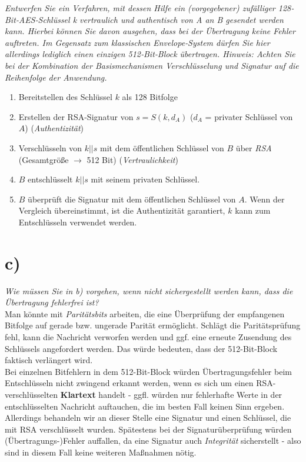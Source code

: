 \textit{Entwerfen Sie ein Verfahren, mit dessen Hilfe ein (vorgegebener) zufälliger 128‐
Bit‐AES‐Schlüssel k vertraulich und authentisch von A an B gesendet werden
kann. Hierbei können Sie davon ausgehen, dass bei der Übertragung keine Fehler
auftreten. Im Gegensatz zum klassischen Envelope‐System dürfen Sie hier allerdings lediglich einen einzigen 512‐Bit‐Block übertragen.
Hinweis: Achten Sie bei der Kombination der Basismechanismen Verschlüsselung und Signatur auf die Reihenfolge der Anwendung.}\\

\noindent

\begin{enumerate}
    \itemsep0.5em
    \item Bereitstellen des Schlüssel $k$ als 128 Bitfolge
    \item Erstellen der RSA-Signatur von $s= S(k, d_A)$ ($d_A$ = privater Schlüssel von $A$) (\textit{Authentizität})
    \item Verschlüsseln von $k||s$ mit dem öffentlichen Schlüssel von $B$ über \textit{RSA} (Gesamtgröße $\rightarrow$ 512 Bit) (\textit{Vertraulichkeit})
    \item $B$ entschlüsselt $k||s$  mit seinem privaten Schlüssel.
    \item $B$ überprüft die Signatur mit dem öffentlichen Schlüssel von $A$.
    Wenn der Vergleich übereinstimmt, ist die Authentizität garantiert, $k$ kann zum Entschlüsseln verwendet werden.
\end{enumerate}


\section{c)}

\textit{Wie müssen Sie in b) vorgehen, wenn nicht sichergestellt werden kann, dass die
Übertragung fehlerfrei ist?}\\

\noindent
Man könnte mit \textit{Paritätsbits} arbeiten, die eine Überprüfung der empfangenen Bitfolge auf gerade bzw. ungerade Parität ermöglicht.
Schlägt die Paritätsprüfung fehl, kann die Nachricht verworfen werden und ggf. eine erneute Zusendung des Schlüssels angefordert werden.
Das würde bedeuten, dass der 512-Bit-Block faktisch verlängert wird.\\

\noindent
Bei einzelnen Bitfehlern in dem 512-Bit-Block würden Übertragungsfehler beim Entschlüsseln nicht zwingend erkannt werden, wenn es sich um einen RSA-verschlüsselten \textbf{Klartext} handelt - ggfl. würden nur fehlerhafte Werte in der entschlüsselten Nachricht auftauchen, die im besten Fall keinen Sinn ergeben.\\
Allerdings behandeln wir an dieser Stelle eine Signatur und einen Schlüssel, die mit RSA verschlüsselt wurden.
Spätestens bei der Signaturüberprüfung würden (Übertragungs-)Fehler auffallen, da eine Signatur auch \textit{Integrität} sicherstellt - also sind in diesem Fall keine weiteren Maßnahmen nötig.